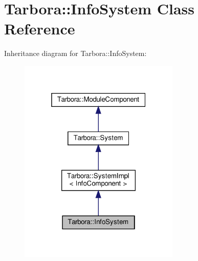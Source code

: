 \hypertarget{classTarbora_1_1InfoSystem}{}\section{Tarbora\+:\+:Info\+System Class Reference}
\label{classTarbora_1_1InfoSystem}


Inheritance diagram for Tarbora\+:\+:Info\+System\+:\nopagebreak
\begin{figure}[H]
\begin{center}
\leavevmode
\includegraphics[width=217pt]{classTarbora_1_1InfoSystem__inherit__graph}
\end{center}
\end{figure}


